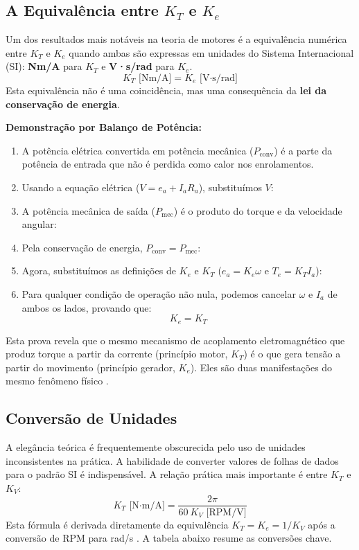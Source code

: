 \documentclass[12pt, a4paper, openright, oneside, brazilian]{abntex2}
\begin{document}
\subsection{A Equivalência entre $K_T$ e $K_e$}

Um dos resultados mais notáveis na teoria de motores é a equivalência numérica entre $K_T$ e $K_e$ quando ambas são expressas em unidades do Sistema Internacional (SI): \textbf{Nm/A} para $K_T$ e \textbf{V·s/rad} para $K_e$.
\begin{equation}
    K_T \text{ [Nm/A]} = K_e \text{ [V·s/rad]}
\end{equation}
Esta equivalência não é uma coincidência, mas uma consequência da \textbf{lei da conservação de energia}.

\textbf{Demonstração por Balanço de Potência:}
\begin{enumerate}
    \item A potência elétrica convertida em potência mecânica ($P_{\text{conv}}$) é a parte da potência de entrada que não é perdida como calor nos enrolamentos.
    \
    \item Usando a equação elétrica ($V = e_a + I_a R_a$), substituímos $V$:
    \
    \item A potência mecânica de saída ($P_{\text{mec}}$) é o produto do torque e da velocidade angular:
    \
    \item Pela conservação de energia, $P_{\text{conv}} = P_{\text{mec}}$:
    \
    \item Agora, substituímos as definições de $K_e$ e $K_T$ ($e_a = K_e \omega$ e $T_e = K_T I_a$):
    \
    \item Para qualquer condição de operação não nula, podemos cancelar $\omega$ e $I_a$ de ambos os lados, provando que:
    \begin{equation}
        K_e = K_T
    \end{equation}
\end{enumerate}
Esta prova revela que o mesmo mecanismo de acoplamento eletromagnético que produz torque a partir da corrente (princípio motor, $K_T$) é o que gera tensão a partir do movimento (princípio gerador, $K_e$). Eles são duas manifestações do mesmo fenômeno físico \parencite{zoltan2012understanding, garcia1997modelagem}.

\subsection{Conversão de Unidades}

A elegância teórica é frequentemente obscurecida pelo uso de unidades inconsistentes na prática. A habilidade de converter valores de folhas de dados para o padrão SI é indispensável. A relação prática mais importante é entre $K_T$ e $K_V$:
\begin{equation}
    K_T \text{ [N·m/A]} = \frac{2\pi }{60 \: K_V \text{ [RPM/V]}}
\end{equation}
Esta fórmula é derivada diretamente da equivalência $K_T = K_e = 1/K_V$ após a conversão de RPM para rad/s \parencite{infineon2011bldc}. A tabela abaixo resume as conversões chave.
\end{document}
